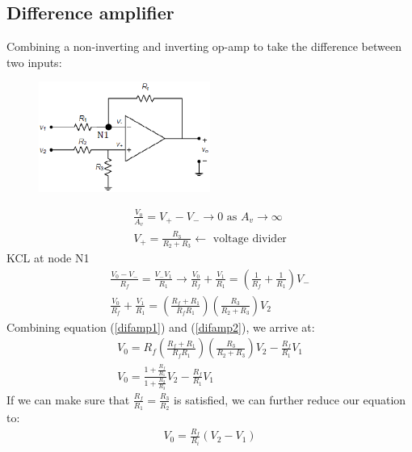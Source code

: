\documentclass[class=report, crop=false, 12pt,a4paper]{standalone}
\begin{document}
\subsection{Difference amplifier}
Combining a non-inverting and inverting op-amp to take the difference between two inputs:
\begin{figure}[H]
  \centering
  \includegraphics[width = 0.5\textwidth]{../img/diagram52.png}
\end{figure}
\begin{gather}
  \frac{V_0}{A_v} = V_+ - V_- \rightarrow 0 \textrm{ as } A_v \rightarrow \infty\\
  V_+ = \frac{R_3}{R_2 + R_3} \leftarrow \textrm{ voltage divider} \label{difamp1}
\end{gather}
KCL at node N1
\begin{gather}
  \frac{V_0 - V_-}{R_f} = \frac{V_- V_1}{R_1} \rightarrow \frac{V_0}{R_f} + \frac{V_1}{R_1} = \left(\frac{1}{R_f} + \frac{1}{R_1}\right)V_-\\
  \frac{V_0}{R_f} + \frac{V_1}{R_1} = \left(\frac{R_f + R_1}{R_f R_1}\right)\left(\frac{R_3}{R_2 + R_3}\right)V_2 \label{difamp2}
\end{gather}
Combining equation (\ref{difamp1}) and (\ref{difamp2}), we arrive at:
\begin{gather}
  V_0 = R_f \left(\frac{R_f + R_1}{R_f R_1}\right)\left(\frac{R_3}{R_2 + R_3}\right)V_2 - \frac{R_f}{R_1} V_1\\
  V_0 = \frac{1 + \frac{R_f}{R_1}}{1 + \frac{R_2}{R_3}}V_2 - \frac{R_f}{R_1}V_1
\end{gather}
If we can make sure that $\frac{R_f}{R_1} = \frac{R_3}{R_2}$ is satisfied, we can further reduce our equation to:
\begin{gather}
  V_0 = \frac{R_f}{R_i}(V_2 - V_1)
\end{gather}
\end{document}
